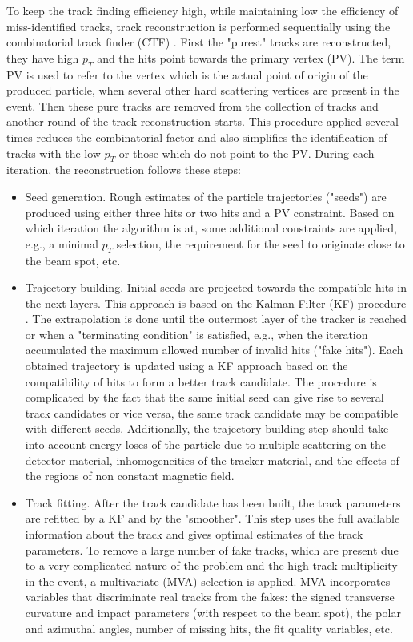 \begin{small}
To keep the track finding efficiency high, while maintaining low the efficiency of miss-identified tracks, track reconstruction is performed sequentially using the combinatorial track finder (CTF) \cite{combined_track_finding}. First the "purest" tracks are reconstructed, they have high $p_T$ and the hits point towards the primary vertex (PV). The term PV is used to refer to the vertex which is the actual point of origin of the produced particle, when several other hard scattering vertices are present in the event. Then these pure tracks are removed from the collection of tracks and another round of the track reconstruction starts. This procedure applied several times reduces the combinatorial factor and also simplifies the identification of tracks with the low $p_T$ or those which do not point to the PV. During each iteration, the reconstruction follows these steps:

\begin{itemize}
\item Seed generation. Rough estimates of the particle trajectories ("seeds") are produced using either three hits or two hits and a PV constraint. Based on which iteration the algorithm is at, some additional constraints are applied, e.g., a minimal $p_T$ selection, the requirement for the seed to originate close to the beam spot, etc. 
\item Trajectory building. Initial seeds are projected towards the compatible hits in the next layers. This approach is based on the Kalman Filter (KF) procedure \cite{Kalman_filter}. The extrapolation is done until the outermost layer of the tracker is reached or when a "terminating condition" is satisfied, e.g., when the iteration accumulated the maximum allowed number of invalid hits ("fake hits"). Each obtained trajectory is updated using a KF approach based on the compatibility of hits to form a better track candidate. The procedure is complicated by the fact that the same initial seed can give rise to several track candidates or vice versa, the same track candidate may be compatible with different seeds. Additionally, the trajectory building step should take into account energy loses of the particle due to multiple scattering on the detector material, inhomogeneities of the tracker material, and the effects of the regions of non constant magnetic field. 
\item Track fitting. After the track candidate has been built, the track parameters are refitted by a KF and by the "smoother". This step uses the full available information about the track and gives optimal estimates of the track parameters. To remove a large number of fake tracks, which are present due to a very complicated nature of the problem and the high track multiplicity in the event, a multivariate (MVA) selection is applied. MVA incorporates variables that discriminate real tracks from the fakes: the signed transverse curvature and impact parameters (with respect to the beam spot), the polar and azimuthal angles, number of missing hits, the fit quality variables, etc. 
\end{itemize}


\end{small}
